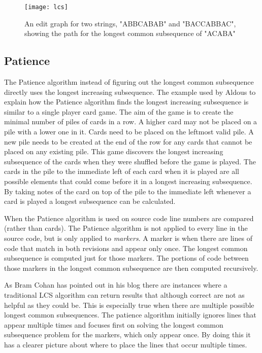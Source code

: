 \begin{figure}[!t]
 \begin{center}
 \texttt{[image: lcs]}
 \end{center}
 \caption{An edit graph for two strings, "ABBCABAB" and "BACCABBAC", showing the path for the longest common subsequence of "ACABA"}
 \label{fig:lcs}
\end{figure}



\subsection{Patience}
The Patience algorithm instead of figuring out the longest common subsequence directly uses the longest increasing subsequence. 
The example used by Aldous \cite{Aldous1999} to explain how the Patience algorithm finds the longest increasing subsequence is similar to a single player card game.
The aim of the game is to create the minimal number of piles of cards in a row.
A higher card may not be placed on a pile with a lower one in it.
Cards need to be placed on the leftmost valid pile. 
A new pile needs to be created at the end of the row for any cards that cannot be placed on any existing pile.
This game discovers the longest increasing subsequence of the cards when they were shuffled before the game is played.
The cards in the pile to the immediate left of each card when it is played are all possible elements that could come before it in a longest increasing subsequence.
By taking notes of the card on top of the pile to the immediate left whenever a card is played a longest subsequence can be calculated.     

When the Patience algorithm is used on source code line numbers are compared (rather than cards).
The Patience algorithm is not applied to every line in the source code, but is only applied to \emph{markers}.
A marker is when there are lines of code that match in both revisions and appear only once.
The longest common subsequence is computed just for those markers.
The portions of code between those markers in the longest common subsequence are then computed recursively.   

As Bram Cohan \cite{bramcohen} has pointed out in his blog there are instances where a traditional LCS algorithm can return results that although correct are not as helpful as they could be.
This is especially true when there are multiple possible longest common subsequences.
The patience algorithm initially ignores lines that appear multiple times and focuses first on solving the longest common subsequence problem for the markers, which only appear once. 
By doing this it has a clearer picture about where to place the lines that occur multiple times.

